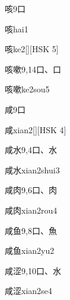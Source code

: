 \begin{Entry}{咳}{9}{⼝}
  \begin{Phonetics}{咳}{hai1}
  \end{Phonetics}
  \begin{Phonetics}{咳}{ke2}[][HSK 5]
  \end{Phonetics}
\end{Entry}

\begin{Entry}{咳嗽}{9,14}{⼝、⼝}
  \begin{Phonetics}{咳嗽}{ke2sou5}
  \end{Phonetics}
\end{Entry}

\begin{Entry}{咸}{9}{⼝}
  \begin{Phonetics}{咸}{xian2}[][HSK 4]
  \end{Phonetics}
\end{Entry}

\begin{Entry}{咸水}{9,4}{⼝、⽔}
  \begin{Phonetics}{咸水}{xian2shui3}
  \end{Phonetics}
\end{Entry}

\begin{Entry}{咸肉}{9,6}{⼝、⾁}
  \begin{Phonetics}{咸肉}{xian2rou4}
  \end{Phonetics}
\end{Entry}

\begin{Entry}{咸鱼}{9,8}{⼝、⿂}
  \begin{Phonetics}{咸鱼}{xian2yu2}
  \end{Phonetics}
\end{Entry}

\begin{Entry}{咸涩}{9,10}{⼝、⽔}
  \begin{Phonetics}{咸涩}{xian2se4}
  \end{Phonetics}
\end{Entry}

